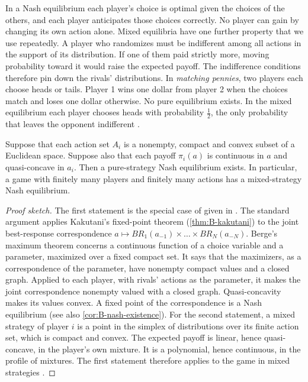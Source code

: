 In a Nash equilibrium each player's choice is optimal given the choices of the others, and each player anticipates
those choices correctly. No player can gain by changing its own action alone. Mixed equilibria have one further
property that we use repeatedly. A player who randomizes must be indifferent among all actions in the support of its
distribution. If one of them paid strictly more, moving probability toward it would raise the expected payoff. The
indifference conditions therefore pin down the rivals' distributions. In \emph{matching pennies}, two players each
choose heads or tails. Player 1 wins one dollar from player 2 when the choices match and loses one dollar otherwise.
No pure equilibrium exists. In the mixed equilibrium each player chooses heads with probability $\frac{1}{2}$, the
only probability that leaves the opponent indifferent \citep[sec.~11.2]{Tirole1988}.

\begin{theorem}\label{thm:02-existence}
Suppose that each action set $A_i$ is a nonempty, compact and convex subset of a Euclidean space. Suppose also that
each payoff $\pi_i(a)$ is continuous in $a$ and quasi-concave in $a_i$. Then a pure-strategy Nash equilibrium
exists. In particular, a game with finitely many players and finitely many actions has a mixed-strategy Nash
equilibrium.
\end{theorem}

\begin{proof}[Proof sketch]
The first statement is the special case of \citet{Debreu1952} given in \citet[sec.~11.6.1]{Tirole1988}. The
standard argument applies Kakutani's fixed-point theorem (\cref{thm:B-kakutani}) to the joint best-response
correspondence
$a \mapsto BR_1(a_{-1}) \times \dots \times BR_N(a_{-N})$. Berge's maximum theorem concerns a continuous function of
a choice variable and a parameter, maximized over a fixed compact set. It says that the maximizers, as a
correspondence of the parameter, have nonempty compact values and a closed graph. Applied to each player, with
rivals' actions as the parameter, it makes the joint correspondence nonempty valued with a closed graph.
Quasi-concavity makes its values convex.
A fixed point of the correspondence is a Nash equilibrium (see also \cref{cor:B-nash-existence}). For the second
statement, a mixed strategy of player $i$
is a point in the simplex of distributions over its finite action set, which is compact and convex. The expected
payoff is linear, hence quasi-concave, in the player's own mixture. It is a polynomial, hence continuous, in the
profile of mixtures. The first statement therefore applies to the game in mixed strategies \citep{Nash1950}.
\end{proof}

